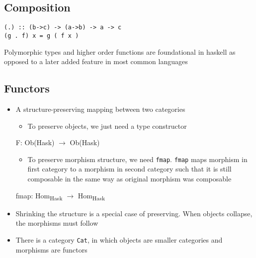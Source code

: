 \documentclass[11pt]{article}
\begin{document}
\subsection{Composition}
\label{sec:org97e878e}
\begin{verbatim}
(.) :: (b->c) -> (a->b) -> a -> c
(g . f) x = g ( f x )
\end{verbatim}
Polymorphic types and higher order functions are foundational in haskell as opposed to a later added feature in most common languages
\subsection{Functors}
\label{sec:org7e9a78e}
\begin{itemize}
\item A structure-preserving mapping between two categories
\begin{itemize}
\item To preserve objects, we just need a type constructor
\end{itemize}

F: Ob(Hask) \(\to\) Ob(Hask)

\begin{itemize}
\item To preserve morphism structure, we need \texttt{fmap}. \texttt{fmap} maps morphism in first category to a morphism in second category such that it is still composable in the same way as original morphism was composable
\end{itemize}

fmap: Hom\textsubscript{Hask} \(\to\) Hom\textsubscript{Hask}

\item Shrinking the structure is a special case of preserving. When objects collapse, the morphisms must follow
\item There is a category \texttt{Cat}, in which objects are smaller categories and morphisms are functors
\end{itemize}
\end{document}
